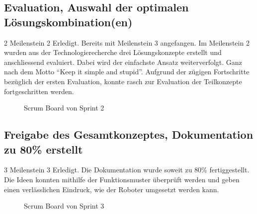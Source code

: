 \subsection*{Evaluation, Auswahl der optimalen Lösungskombination(en)}
\workday
    {2}
    {\ok Meilenstein 2 Erledigt. Bereits mit Meilenstein 3 angefangen.}
    {
      Im Meilenstein 2 wurden aus der Technologierecherche drei Lösungskonzepte erstellt
      und anschliessend evaluiert. Dabei wird der einfachste Ansatz weiterverfolgt. 
      Ganz nach dem Motto ``Keep it simple and stupid''.
    }
    {
      Aufgrund der zügigen Fortschritte bezüglich der ersten Evaluation, konnte rasch zur Evaluation der Teilkonzepte fortgeschritten werden.
    }
    \begin{figure}[H]
        \caption{Scrum Board von Sprint 2}
    \end{figure}
    
\subsection*{Freigabe des Gesamtkonzeptes, Dokumentation zu 80\% erstellt}
\workday
    {3}
    {\ok Meilenstein 3 Erledigt.}
    {
      Die Dokumentation wurde soweit zu 80\% fertiggestellt. 
    }
    {
      Die Ideen konnten mithilfe der Funktionsmuster überprüft werden und geben einen verlässlichen Eindruck, wie der Roboter umgesetzt werden kann.
    }
    \begin{figure}[H]
        \caption{Scrum Board von Sprint 3}
    \end{figure}